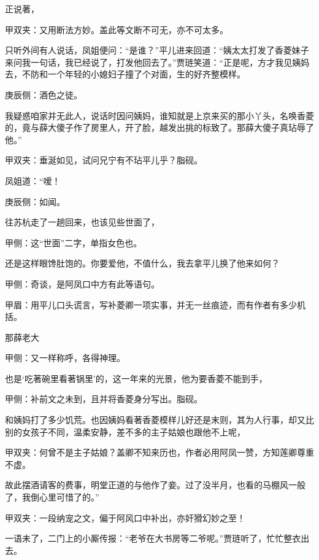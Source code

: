 \begin{parag}
    正说著，\begin{note}甲双夹：又用断法方妙。盖此等文断不可无，亦不可太多。\end{note}只听外间有人说话，凤姐便问：“是谁？”平儿进来回道：“姨太太打发了香菱妹子来问我一句话，我已经说了，打发他回去了。”贾琏笑道：“正是呢，方才我见姨妈去，不防和一个年轻的小媳妇子撞了个对面，生的好齐整模样。\begin{note}庚辰侧：酒色之徒。\end{note}我疑惑咱家并无此人，说话时因问姨妈，谁知就是上京来买的那小丫头，名唤香菱的，竟与薛大傻子作了房里人，开了脸，越发出挑的标致了。那薛大傻子真玷辱了他。”\begin{note}甲双夹：垂涎如见，试问兄宁有不玷平儿乎？脂砚。\end{note}凤姐道：“嗳！\begin{note}庚辰侧：如闻。\end{note}往苏杭走了一趟回来，也该见些世面了，\begin{note}甲侧：这“世面”二字，单指女色也。\end{note}还是这样眼馋肚饱的。你要爱他，不值什么，我去拿平儿换了他来如何？\begin{note}甲侧：奇谈，是阿凤口中方有此等语句。\end{note}\begin{note}甲眉：用平儿口头谎言，写补菱卿一项实事，并无一丝痕迹，而有作者有多少机括。\end{note}那薛老大\begin{note}甲侧：又一样称呼，各得神理。\end{note}也是‘吃著碗里看著锅里’的，这一年来的光景，他为要香菱不能到手，\begin{note}甲侧：补前文之未到，且并将香菱身分写出。脂砚。\end{note}和姨妈打了多少饥荒。也因姨妈看著香菱模样儿好还是末则，其为人行事，却又比别的女孩子不同，温柔安静，差不多的主子姑娘也跟他不上呢，\begin{note}甲双夹：何曾不是主子姑娘？盖卿不知来历也，作者必用阿凤一赞，方知莲卿尊重不虚。\end{note}故此摆酒请客的费事，明堂正道的与他作了妾。过了没半月，也看的马棚风一般了，我倒心里可惜了的。”\begin{note}甲双夹：一段纳宠之文，偏于阿风口中补出，亦奸猾幻妙之至！\end{note}一语未了，二门上的小厮传报：“老爷在大书房等二爷呢。”贾琏听了，忙忙整衣出去。
\end{parag}


